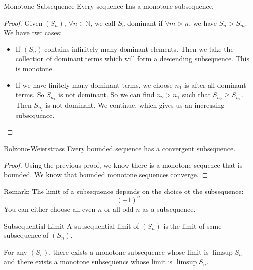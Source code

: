 \documentclass{report}
\begin{document}
\begin{theorem}{Monotone Subsequence}
    Every sequence has a monotone subsequence.
\end{theorem}
    \begin{proof}
        Given $(S_{n})$, $\forall n \in \mathbb{N}$, we call $S_{n}$ dominant if $\forall m > n$, we have $S_{n} > S_{m}$. We have two cases:
            \begin{itemize}
                \item If $(S_{n})$ contains infinitely many dominant elements. Then we take the collection of dominant terms which will form a descending subsequence. This is monotone.

                \item If we have finitely many dominant terms, we choose $n_{1}$ is after all dominant terms. So $S_{n_{1}}$ is not dominant. So we can find $n_{2} > n_{1}$ such that $S_{n_{2}} \geq S_{n_{1}}$. Then $S_{n_{2}}$ is not dominant. We continue, which gives us an increasing subsequence.
            \end{itemize}
    \end{proof}

\begin{theorem}{Bolzono-Weierstrass}
    Every bounded sequence has a convergent subsequence.
\end{theorem}
    \begin{proof}
        Using the previous proof, we know there is a monotone sequence that is bounded. We know that bounded monotone sequences converge.
    \end{proof}

Remark: The limit of a subsequence depends on the choice ot the subsequence:
    \begin{equation*}
        (-1)^{n}
    \end{equation*}
You can either choose all even $n$ or all odd $n$ as a subsequence.

\begin{definition}{Subsequential Limit}
    A subsequential limit of $(S_{n})$ is the limit of some subsequence of $(S_{n})$.
\end{definition}

\begin{theorem}{11.7}
    For any $(S_{n})$, there exists a monotone subsequence whose limit is $\limsup S_{n}$ and there exists a monotone subsequence whose limit is $\limsup S_{n}$.
\end{theorem}
\end{document}
